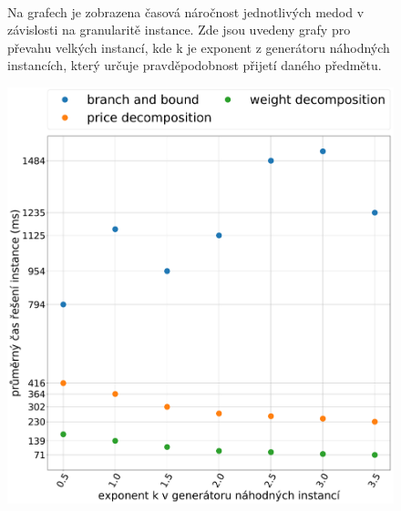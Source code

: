 \documentclass[11pt]{article}
\begin{document}
\begin{figure}
\begin{minipage}[c]{0.49\textwidth}
    \end{minipage}
    \\
   \caption{Na grafech je zobrazena časová náročnost jednotlivých medod v závislosti na granularitě instance. Zde jsou uvedeny grafy pro převahu velkých instancí, kde k je exponent z generátoru náhodných instancích, který určuje pravděpodobnost přijetí daného předmětu.}\label{fig:GVI}
    \end{figure} 
    
    \begin{figure}
	\centering
    \begin{minipage}[c]{0.49\textwidth}
        \centering\includegraphics[width=\textwidth]{img/GME.pdf} 
    \end{minipage}
    \begin{minipage}[c]{0.49\textwidth}

\end{minipage}
\end{figure}
\end{document}
